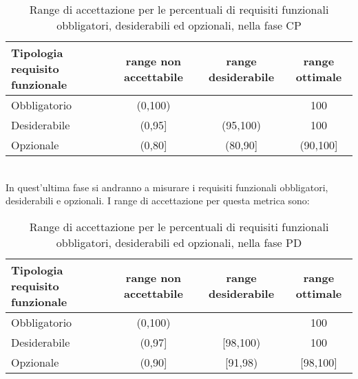 \begin{description}
							\begin{table}[H]
								\centering
									\begin{tabu}{| l | c | c | c |}\hline
										Tipologia requisito funzionale	&	range non accettabile & range desiderabile & range ottimale \\ \hline	\hline

										Obbligatorio	&	(0,100) &  &  100 \\ \hline
										Desiderabile	&  (0,95]& (95,100) & 100 \\ \hline
										Opzionale		&  (0,80]& (80,90] & (90,100] \\ \hline
									\end{tabu}
									\caption{Range di accettazione per le percentuali di requisiti funzionali obbligatori, desiderabili ed opzionali, nella fase CP}
							\end{table}

						\item[\insphase{Fase PD}] \hfill \\
						In quest'ultima fase si andranno a misurare i requisiti funzionali obbligatori, desiderabili e opzionali. I range di accettazione per questa metrica sono:

						\begin{table}[H]
							\centering
								\begin{tabu}{| l | c | c | c |}\hline
									Tipologia requisito funzionale	&	range non accettabile & range desiderabile & range ottimale \\ \hline	\hline

									Obbligatorio	&	(0,100) &  &  100 \\ \hline
									Desiderabile	&  (0,97]& [98,100) & 100 \\ \hline
									Opzionale		&  (0,90]& [91,98) & [98,100] \\ \hline
								\end{tabu}
								\caption{Range di accettazione per le percentuali di requisiti funzionali obbligatori, desiderabili ed opzionali, nella fase PD}
						\end{table}
					\end{description}

